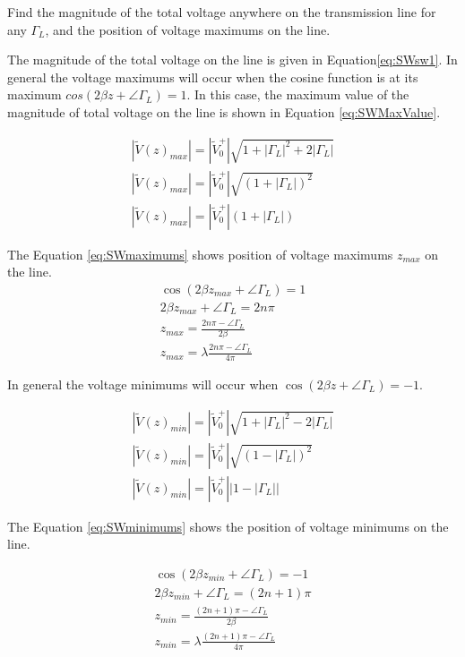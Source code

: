 \documentclass{ximera}
\begin{document}
\begin{example}

Find the magnitude of the total voltage anywhere on the transmission line for any $\Gamma_L$, and the position of voltage maximums on the line.
\begin{explanation}
 

The magnitude of the total voltage on the line is given in Equation\ref{eq:SWsw1}.  In general the voltage maximums will occur when the cosine function  is at its maximum
$cos(2 \beta z+\angle \Gamma_L)=1$. In this case, the maximum value of the magnitude of total voltage on the line is shown in Equation \ref{eq:SWMaxValue}.

\begin{eqnarray}
|\tilde{V}(z)_{max}|=|\tilde{V}_0^+|\sqrt{1+|\Gamma_L|^2+2 |\Gamma_L|} \nonumber  \\
|\tilde{V}(z)_{max}| =|\tilde{V}_0^+|\sqrt{(1+|\Gamma_L|)^2}  \nonumber \\
|\tilde{V}(z)_{max}| =|\tilde{V}_0^+|(1+|\Gamma_L|) \label{eq:SWMaxValue} 
\end{eqnarray}


The Equation \ref{eq:SWmaximums}  shows position of voltage maximums $z_{max}$ on the line. 
\begin{eqnarray}
\cos(2\beta z_{max}+\angle\Gamma_L)=1 \nonumber \\
2\beta z_{max}+\angle\Gamma_L=2n\pi \nonumber \\
z_{max}=\frac{2n\pi-\angle\Gamma_L}{2\beta} \nonumber \\
z_{max}=\lambda\frac{2n\pi-\angle\Gamma_L}{4\pi} \label{eq:SWmaximums}
\end{eqnarray}

In general the voltage minimums will occur when
$\cos(2\beta z+\angle\Gamma_L)=-1$.
 

\begin{eqnarray}
|\tilde{V}(z)_{min}|=|\tilde{V}_0^+|\sqrt{1+|\Gamma_L|^2-2 |\Gamma_L|} \nonumber  \\
|\tilde{V}(z)_{min}| =|\tilde{V}_0^+|\sqrt{(1-|\Gamma_L|)^2}  \nonumber \\
|\tilde{V}(z)_{min}| =|\tilde{V}_0^+|\left|1-|\Gamma_L|\right|
\end{eqnarray}

The Equation \ref{eq:SWminimums}  shows the position of voltage minimums on the line. 


\begin{eqnarray}
\cos(2\beta z_{min}+\angle\Gamma_L)=-1 \nonumber \\
2\beta z_{min}+\angle\Gamma_L=(2n+1)\pi \nonumber \\
z_{min}=\frac{(2n+1)\pi-\angle\Gamma_L}{2\beta} \nonumber \\
z_{min}=\lambda\frac{(2n+1)\pi-\angle\Gamma_L}{4\pi} \label{eq:SWminimums}
\end{eqnarray}


\end{explanation}
\end{example}
\end{document}
